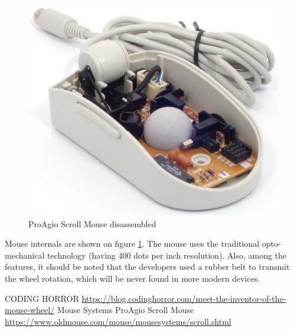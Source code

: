 \documentclass[11pt, a4paper]{article}
\begin{document}
\begin{figure}[h]
    \centering
    \includegraphics[scale=0.8]{1995_pro_agio_scroll_mouse/inside_30.jpg}
    \caption{ProAgio Scroll Mouse disassembled}
    \label{fig:ScrollInside}
\end{figure}

Mouse internals are shown on figure \ref{fig:ScrollInside}. The mouse uses the traditional opto-mechanical technology (having 400 dots per inch resolution). Also, among the features, it should be noted that the developers used a rubber belt to transmit the wheel rotation, which will be never found in more modern devices.

\begin{thebibliography}{9}
 CODING HORROR \url{https://blog.codinghorror.com/meet-the-inventor-of-the-mouse-wheel/}
 Mouse Systems ProAgio Scroll Mouse \url{https://www.oldmouse.com/mouse/mousesystems/scroll.shtml}
\end{thebibliography}
\end{document}
